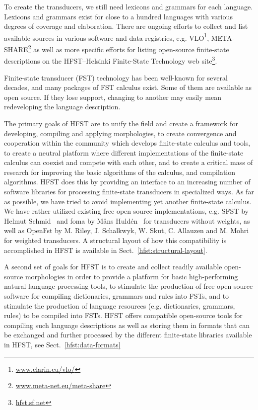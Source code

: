 \documentclass{llncs}
\begin{document}
To create the transducers, we still need lexicons and grammars for each language.
Lexicons and grammars exist for close to a hundred languages with various degrees 
of coverage and elaboration. There are ongoing efforts to collect and list available 
sources in various software and data registries, e.g. VLO\footnote{\url{www.clarin.eu/vlo/}}, 
META-SHARE\footnote{\url{www.meta-net.eu/meta-share}} as well as more specific
efforts for listing open-source finite-state descriptions on the 
HFST--Helsinki Finite-State Technology web site\footnote{\url{hfst.sf.net}}.


Finite-state transducer (FST) technology has been well-known for several 
decades, and many packages of FST calculus exist. Some of them are 
available as open source. If they lose support, changing to another may
easily mean redeveloping the language description. 

The primary goals of HFST are to unify the field and create a framework for developing, 
compiling and applying morphologies, to create convergence and cooperation within the
community which develops finite-state calculus and tools, to create a neutral platform 
where different implementations of the finite-state calculus can coexist and compete 
with each other, and to create a critical mass of research for improving the basic algorithms 
of the calculus, and compilation algorithms.  
HFST does this by providing an interface to an increasing number of software libraries 
for processing finite-state transducers in specialized ways. As far as possible, 
we have tried to avoid implementing yet another finite-state calculus. We have 
rather utilized existing free open source implementations, e.g. SFST by Helmut 
Schmid~\cite{schmid/2005} and foma by Måns Huldén~\cite{hulden/2009} 
for transducers without weights, as well as OpenFst  by M. Riley, J. Schalkwyk, W. Skut, 
C. Allauzen and M. Mohri~\cite{openfst/2007} for weighted transducers. A structural 
layout of how this compatibility is accomplished in HFST is available in Sect.~\ref{hfst:structural-layout}.

A second set of goals for HFST is to create and collect  
readily available open-source morphologies in order to provide a platform for basic 
high-performing natural language processing tools, to stimulate the production of free 
open-source software for compiling dictionaries, grammars and rules into FSTs, and to 
stimulate the production of language resources (e.g. dictionaries, grammars, rules) to 
be compiled into FSTs. 
HFST offers compatible open-source tools 
for compiling such language descriptions as well as storing them 
in formats that can be exchanged and further processed by the different finite-state libraries 
available in HFST, see Sect.~\ref{hfst:data-formats}
\end{document}
